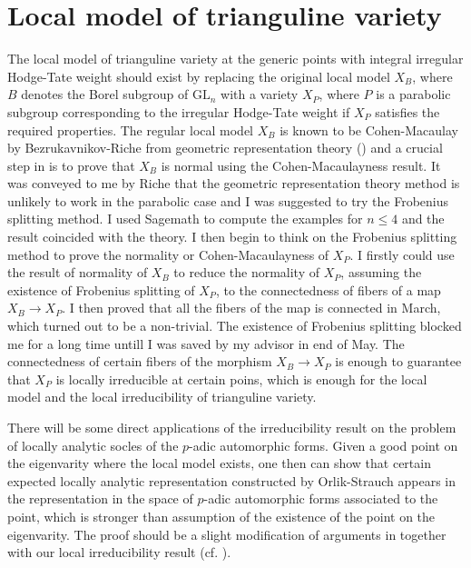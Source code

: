 \documentclass{amsart}
\newcommand{\GL}{\text{GL}}
\numberwithin{equation}{section}
\begin{document}
\section{Local model of trianguline variety}
The local model of trianguline variety at the generic points with integral irregular Hodge-Tate weight should exist by replacing the original local model $X_B$, where $B$ denotes the Borel subgroup of $\GL_n$ with a variety $X_P$, where $P$ is a parabolic subgroup corresponding to the irregular Hodge-Tate weight if $X_P$ satisfies the required properties. The regular local model $X_{B}$ is known to be Cohen-Macaulay by Bezrukavnikov-Riche from geometric representation theory (\cite{riche2008geometric}) and a crucial step in \cite{breuil2019local} is to prove that $X_B$ is normal using the Cohen-Macaulayness result. It was conveyed to me by Riche that the geometric representation theory method is unlikely to work in the parabolic case and I was suggested to try the Frobenius splitting method. I used Sagemath to compute the examples for $n\leq 4$ and the result coincided with the theory. I then begin to think on the Frobenius splitting method to prove the normality or Cohen-Macaulayness of $X_P$. I firstly could use the result of normality of $X_B$ to reduce the normality of $X_P$, assuming the existence of Frobenius splitting of $X_P$, to the connectedness of fibers of a map $X_B\rightarrow X_P$. I then proved that all the fibers of the map is connected in March, which turned out to be a non-trivial. The existence of Frobenius splitting blocked me for a long time untill I was saved by my advisor in end of May. The connectedness of certain fibers of the morphism $X_B\rightarrow X_P$ is enough to guarantee that $X_P$ is locally irreducible at certain poins, which is enough for the local model and the local irreducibility of trianguline variety.\par
There will be some direct applications of the irreducibility result on the problem of locally analytic socles of the $p$-adic automorphic forms. Given a good point on the eigenvarity where the local model exists, one then can show that certain expected locally analytic representation constructed by Orlik-Strauch appears in the representation in the space of $p$-adic automorphic forms associated to the point, which is stronger than assumption of the existence of the point on the eigenvarity. The proof should be a slight modification of arguments in \cite{breuil2019local} together with our local irreducibility result (cf. \cite{Wu2020unibranch}).\par
\end{document}
